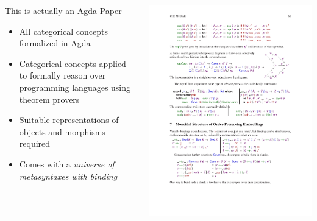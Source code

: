 \documentclass[aspectratio=169]{beamer}
\theoremstyle{remarkstyle}
\begin{document}
\begin{frame}[fragile]
  \begin{columns}
    \begin{column}{0.5\textwidth}
      \large{\color{bblue} This is actually an Agda Paper}
      \vspace{10mm}
      \begin{itemize}
        \item All categorical concepts formalized in Agda
        \item Categorical concepts applied to formally reason over programming languages using theorem provers
        \item Suitable representations of objects and morphisms required
        \item Comes with a \emph{universe of metasyntaxes with binding} 
      \end{itemize}
      \vspace{30mm}
    \end{column}
    \begin{column}{0.5\textwidth}
      \includegraphics[height=1.15\textheight]{codebruijn-9.pdf}
    \end{column}
  \end{columns}
\end{frame}
\end{document}
